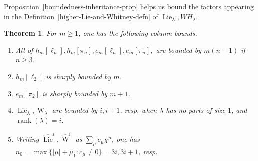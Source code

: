 \documentclass[12pt]{amsart}
\theoremstyle{plain}
\newtheorem{thm}{Theorem}[section]
\theoremstyle{definition}
\begin{document}
Proposition~\ref{boundedness-inheritance-prop}
helps us bound the factors appearing in the 
Definition~\eqref{higher-Lie-and-Whitney-defn} of ${{\operatorname{Lie}}}_\lambda, WH_\lambda$.

\begin{thm}
\label{plethysm-and-Whitney-bounds-cor}
For $m \geq 1$, one has the following column bounds.
\begin{enumerate}
\item[(a)]
All of $h_m[\ell_n], h_m[\pi_n], e_m[\ell_n],e_m[\pi_n],$ are bounded by $m(n-1)$ if $n \geq 3$.
\item[(b)]
$h_m[\ell_2]$ is sharply bounded by $m$.
\item[(c)]
$e_m[\pi_2]$ is sharply bounded by $m+1$.
\item[(d)]
${{\operatorname{Lie}}}_\lambda, {{\operatorname{W}}}_\lambda$ are bounded by $i,i+1$,
resp. when $\lambda$  has no parts of size $1$, and ${{\operatorname{rank}}}(\lambda)=i$.
\item[(e)]
Writing $\widehat{{\operatorname{Lie}}}^i,  \widehat{{\operatorname{W}}}^i$ as
 $\sum_\mu c_\mu \chi^{\mu}$,  
one has $n_0=\max \{|\mu|+\mu_1: c_\mu \neq 0\}=3i, 3i+1$, resp.
\end{enumerate}
\end{thm}
\end{document}
